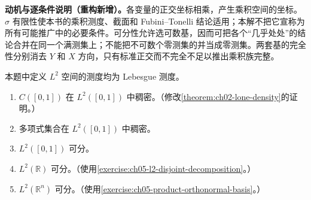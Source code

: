 \documentclass[../../main.tex]{subfiles}
\begin{document}
\begin{remark}
\textbf{动机与逐条件说明（重构新增）。}各变量的正交坐标相乘，产生乘积空间的坐标。$\sigma$ 有限性使本书的乘积测度、截面和 Fubini--Tonelli 结论适用；本解不把它宣称为所有可能推广中的必要条件。可分性允许选可数基，因而可把各个“几乎处处”的结论合并在同一个满测集上；不能把不可数个零测集的并当成零测集。两套基的完全性分别消去 $Y$ 和 $X$ 方向，只有标准正交而不完全不足以推出乘积族完整。
\end{remark}
\begin{exercise}\label{exercise:ch05-lebesgue-l2-separable}
本题中定义 $L^2$ 空间的测度均为 Lebesgue 测度。
\begin{enumerate}
\item\label{item:ch05-continuous-l2-dense} $C([0,1])$ 在 $L^2([0,1])$ 中稠密。（修改\cref{theorem:ch02-lone-density}的证明。）
\item\label{item:ch05-polynomial-l2-dense} 多项式集合在 $L^2([0,1])$ 中稠密。
\item\label{item:ch05-interval-l2-separable} $L^2([0,1])$ 可分。
\item\label{item:ch05-line-l2-separable} $L^2(\mathbb R)$ 可分。（使用\cref{exercise:ch05-l2-disjoint-decomposition}。）
\item\label{item:ch05-euclidean-l2-separable} $L^2(\mathbb R^n)$ 可分。（使用\cref{exercise:ch05-product-orthonormal-basis}。）
\end{enumerate}
\end{exercise}
\end{document}
